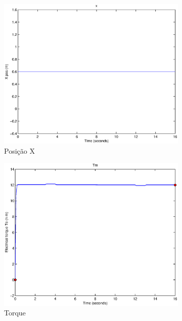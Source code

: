 \documentclass{article}
\begin{document}
\begin{figure}[H]
\begin{subfigure}{0.45\textwidth}
		\includegraphics[width=\linewidth]{matlab/x9}
		\caption{Posição X}
	\end{subfigure}
	\begin{subfigure}{0.45\textwidth}
		\includegraphics[width=\linewidth]{matlab/tm9}
		\caption{Torque}
	\end{subfigure}
	\begin{subfigure}{0.45\textwidth}

\end{subfigure}
\end{figure}
\end{document}
